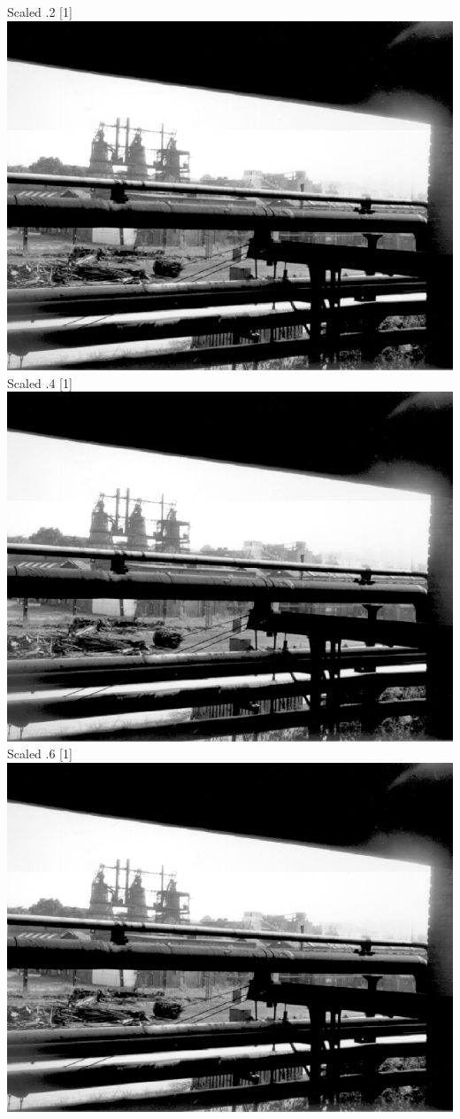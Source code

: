 \documentclass{article}
\begin{document}
Scaled .2 \scalebox{.2}[1]{\includegraphics{HF.ps}}
Scaled .4 \scalebox{.4}[1]{\includegraphics{HF.ps}}
Scaled .6 \scalebox{.6}[1]{\includegraphics{HF.ps}}
\end{document}
